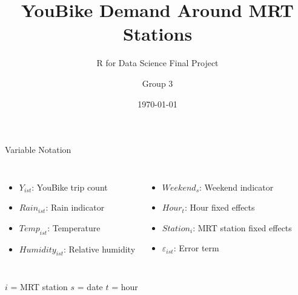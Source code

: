 \documentclass[aspectratio=169]{beamer}
\title{YouBike Demand Around MRT Stations}
\subtitle{R for Data Science Final Project}
\author{Group 3}
\date{\today}
\begin{document}
\begin{frame}
\titlepage
\end{frame}

\begin{frame}{Variable Notation}

\small

\begin{columns}[T]


\begin{itemize}
    \item $Y_{ist}$: YouBike trip count
    \item $Rain_{ist}$: Rain indicator
    \item $Temp_{ist}$: Temperature
    \item $Humidity_{ist}$: Relative humidity
\end{itemize}


\begin{itemize}
    \item $Weekend_s$: Weekend indicator
    \item $Hour_t$: Hour fixed effects
    \item $Station_i$: MRT station fixed effects
    \item $\varepsilon_{ist}$: Error term
\end{itemize}

\end{columns}

\vspace{0.4cm}

\begin{center}
\footnotesize
$i$ = MRT station \qquad
$s$ = date \qquad
$t$ = hour
\end{center}

\end{frame}
\end{document}
